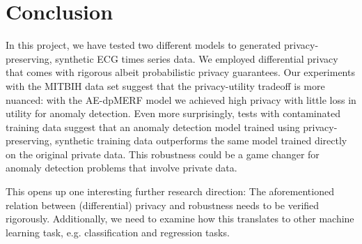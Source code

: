 \section{Conclusion}

In this project, we have tested two different models to generated privacy-preserving, synthetic ECG times series data. We employed differential privacy that comes with rigorous albeit probabilistic privacy guarantees. Our experiments with the MITBIH data set suggest that the privacy-utility tradeoff is more nuanced: with the AE-dpMERF model we achieved high privacy with little loss in utility for anomaly detection. Even more surprisingly, tests with contaminated training data suggest that an anomaly detection model trained using privacy-preserving, synthetic training data outperforms the same model trained directly on the original private data. This robustness could be a game changer for anomaly detection problems that involve private data. 

This opens up one interesting further research direction: The aforementioned relation between (differential) privacy and robustness needs to be verified rigorously. Additionally, we need to examine how this translates to other machine learning task, e.g. classification and regression tasks. 
